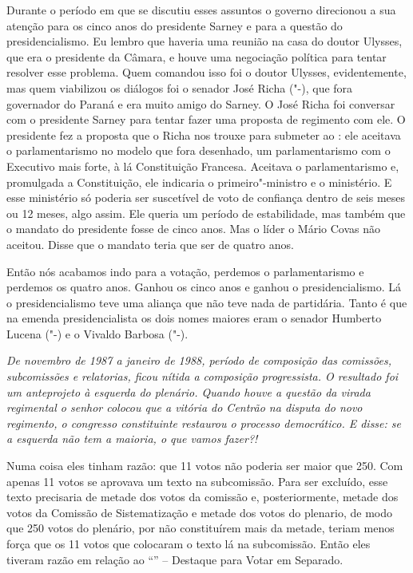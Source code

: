 Durante o período em que se discutiu esses assuntos o governo direcionou
a sua atenção para os cinco anos do presidente Sarney e para a questão
do presidencialismo. Eu lembro que haveria uma reunião na casa do doutor
Ulysses, que era o presidente da Câmara, e houve uma negociação política
para tentar resolver esse problema. Quem comandou isso foi o doutor
Ulysses, evidentemente, mas quem viabilizou os diálogos foi o senador
José Richa ("-), que fora governador do Paraná e era muito amigo do
Sarney. O José Richa foi conversar com o presidente Sarney para tentar
fazer uma proposta de regimento com ele. O presidente fez a proposta que
o Richa nos trouxe para submeter ao : ele aceitava o parlamentarismo
no modelo que fora desenhado, um parlamentarismo com o Executivo mais
forte, à lá Constituição Francesa. Aceitava o parlamentarismo e,
promulgada a Constituição, ele indicaria o primeiro"-ministro e o
ministério. E esse ministério só poderia ser suscetível de voto de
confiança dentro de seis meses ou 12 meses, algo assim. Ele queria um
período de estabilidade, mas também que o mandato do presidente fosse de
cinco anos. Mas o líder o Mário Covas não aceitou. Disse que o mandato
teria que ser de quatro anos.

Então nós acabamos indo para a votação, perdemos o parlamentarismo e
perdemos os quatro anos. Ganhou os cinco anos e ganhou o
presidencialismo. Lá o presidencialismo teve uma aliança que não teve
nada de partidária. Tanto é que na emenda presidencialista os dois nomes
maiores eram o senador Humberto Lucena ("-) e o Vivaldo Barbosa
("-).

\medskip

\noindent\emph{De novembro de 1987 a janeiro de 1988, período de composição das
comissões, subcomissões e relatorias, ficou nítida a composição
progressista. O resultado foi um anteprojeto à esquerda do plenário.
Quando houve a questão da virada regimental o senhor colocou que a
vitória do Centrão na disputa do novo regimento, o congresso
constituinte restaurou o processo democrático. E disse: se a esquerda
não tem a maioria, o que vamos fazer?!}

Numa coisa eles tinham razão: que 11 votos não poderia
ser maior que 250. Com apenas 11 votos se aprovava um texto na
subcomissão. Para ser excluído, esse texto precisaria de metade dos
votos da comissão e, posteriormente, metade dos votos da Comissão de
Sistematização e metade dos votos do plenario, de modo que 250 votos do
plenário, por não constituírem mais da metade, teriam menos força que os
11 votos que colocaram o texto lá na subcomissão. Então eles tiveram
razão em relação ao ``'' -- Destaque para Votar em Separado.

